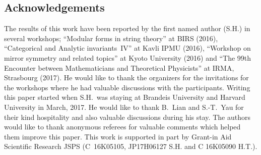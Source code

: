 \documentclass[pdftex]{sigma}
\numberwithin{equation}{section}
\begin{document}
\subsection*{Acknowledgements} The results of this work have been reported by the first named author (S.H.) in several workshops; ``Modular forms in string theory'' at BIRS (2016), ``Categorical and Analytic invariants~IV'' at Kavli IPMU (2016), ``Workshop on mirror symmetry and related topics'' at Kyoto University (2016) and ``The 99th Encounter between Mathematicians and Theoretical Physicists'' at IRMA, Strasbourg (2017). He would like to thank the organizers for the invitations for the workshops where he had valuable discussions with the participants. Writing this paper started when S.H.~was staying at Brandeis University and Harvard University in March, 2017. He would like to thank B.~Lian and S.-T.~Yau for their kind hospitality and also valuable discussions during his stay. The authors would like to thank anonymous referees for valuable comments which helped them improve this paper. This work is supported in part by Grant-in Aid Scientific Research JSPS (C~16K05105, JP17H06127 S.H. and C 16K05090 H.T.).
\end{document}
